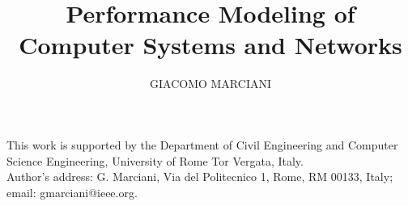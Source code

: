 \documentclass[prodmode,gmlecture]{acmlarge}
\title{Performance Modeling of Computer Systems and Networks}
\author{GIACOMO MARCIANI \affil{University of Rome Tor Vergata}}
\numberwithin{equation}{section}
\begin{document}
\begin{bottomstuff}
	This work is supported by the Department of Civil Engineering and Computer Science
	Engineering, University of Rome Tor Vergata, Italy.\\
	Author's address: G. Marciani, Via del Politecnico 1, Rome, RM 00133, Italy;
	email: gmarciani@ieee.org.
\end{bottomstuff}

\maketitle



































\end{document}
